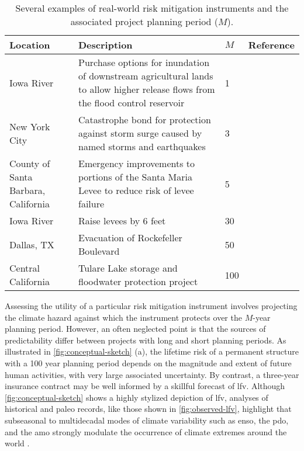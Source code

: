 \documentclass[
  draft,
  linenumbers
]{agujournal2018}
\begin{document}
\noindent\begin{table}
  {\footnotesize
    \begin{tabular}{L{1in}L{2.5in}L{0.3in}L{1.7in}}
      \toprule
      Location & Description & $M$ & Reference \\
      \midrule
      Iowa River & Purchase options for inundation of downstream agricultural lands to allow higher release flows from the flood control reservoir & 1 & \citet{Spence:2016ca} \\
      New York City & Catastrophe bond for protection against storm surge caused by named storms and earthquakes & 3 &  \\
      County of Santa Barbara, California & Emergency improvements to portions of the Santa Maria Levee to reduce risk of levee failure & 5 & \citet{USACE:2007ta} \\
      Iowa River & Raise levees by 6 feet & 30 & \citet{Spence:2016ca} \\
      Dallas, TX & Evacuation of Rockefeller Boulevard & 50 & \citet{USACE:2014vn} \\
      Central California & Tulare Lake storage and floodwater protection project & 100 & \citet{GEI:gIaEZ-gS} \\
      \bottomrule
    \end{tabular}
    \caption{
      Several examples of real-world risk mitigation instruments and the associated project planning period ($M$).
    }\label{tab:real-world-M}
  }
\end{table}

Assessing the utility of a particular risk mitigation instrument involves projecting the climate hazard against which the instrument protects over the $M$-year planning period.
However, an often neglected point is that the sources of predictability differ between projects with long and short planning periods.
As illustrated in \cref{fig:conceptual-sketch} (a), the lifetime risk of a permanent structure with a 100 year planning period depends on the magnitude and extent of future human activities, with very large associated uncertainty.
By contrast, a three-year insurance contract may be well informed by a skillful forecast of \gls{lfv}.
Although \cref{fig:conceptual-sketch} shows a highly stylized depiction of \gls{lfv}, analyses of historical and paleo records, like those shown in \cref{fig:observed-lfv}, highlight that subseasonal to multidecadal modes of climate variability such as \gls{enso}, the \gls{pdo}, and the \gls{amo} strongly modulate the occurrence of climate extremes around the world \citep{Ropelewski:1987do, Cook:2010bz, Swierczynski:2012km, Hodgkins:2017hw, Woollings:2018ea}.
\end{document}
